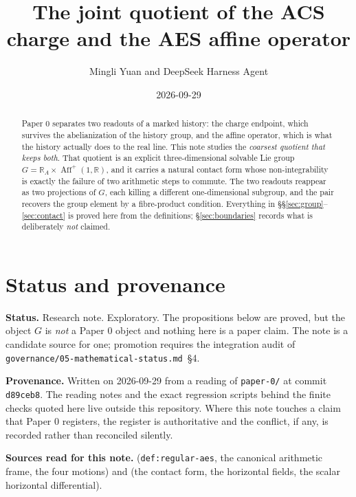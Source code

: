 \documentclass[11pt]{article}
\title{The joint quotient of the ACS charge and the AES affine operator}
\author{Mingli Yuan and DeepSeek Harness Agent}
\date{2026-09-29}
\begin{document}
\maketitle

\begin{abstract}
Paper 0 separates two readouts of a marked history: the charge endpoint, which
survives the abelianization of the history group, and the affine operator, which
is what the history actually does to the real line. This note studies the
\emph{coarsest quotient that keeps both}. That quotient is an explicit
three-dimensional solvable Lie group
$G=\mathbb R_A\times\operatorname{Aff}^+(1,\mathbb R)$, and it carries a natural
contact form whose non-integrability is exactly the failure of two arithmetic
steps to commute. The two readouts reappear as two projections of $G$, each
killing a different one-dimensional subgroup, and the pair recovers the group
element by a fibre-product condition. Everything in \S\S\ref{sec:group}--%
\ref{sec:contact} is proved here from the definitions; \S\ref{sec:boundaries}
records what is deliberately \emph{not} claimed.
\end{abstract}

\tableofcontents

\section{Status and provenance}
\label{sec:status}

\textbf{Status.} Research note. Exploratory. The propositions below are proved,
but the object $G$ is \emph{not} a Paper 0 object and nothing here is a paper
claim. The note is a candidate source for one; promotion requires the
integration audit of \texttt{governance/05-mathematical-status.md}~\S4.

\textbf{Provenance.} Written on 2026-09-29 from a reading of
\texttt{paper-0/} at commit \texttt{d89ceb8}. The reading notes and the exact
regression scripts behind the finite checks quoted here live outside this
repository. Where this note touches a claim that Paper 0 registers, the register
is authoritative and the conflict, if any, is recorded rather than reconciled
silently.

\textbf{Sources read for this note.} 
(\texttt{def:regular-aes}, the canonical arithmetic frame, the four motions) and
 (the contact form, the
horizontal fields, the scalar horizontal differential).
\end{document}
